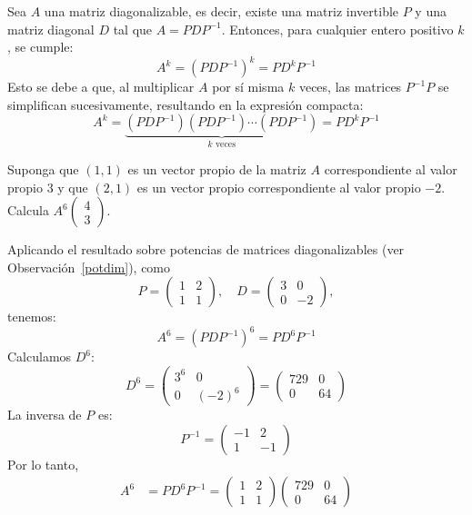 \begin{rem}\label{potdim}
Sea $A$ una matriz diagonalizable, es decir, existe una matriz invertible $P$ y una matriz diagonal $D$ tal que $A = P D P^{-1}$. Entonces, para cualquier entero positivo $k$, se cumple:
\[
A^k = (P D P^{-1})^k = P D^k P^{-1}
\]
Esto se debe a que, al multiplicar $A$ por sí misma $k$ veces, las matrices $P^{-1}P$ se simplifican sucesivamente, resultando en la expresión compacta:
\[
A^k = \underbrace{(P D P^{-1})(P D P^{-1}) \cdots (P D P^{-1})}_{k \text{ veces}} = P D^k P^{-1}
\]
\end{rem}

\begin{example}
Suponga que $(1,1)$ es un vector propio de la matriz $A$ correspondiente al valor propio $3$ y que $(2,1)$ es un vector propio correspondiente al valor propio $-2$. Calcula $A^6 \begin{pmatrix} 4 \\ 3 \end{pmatrix}$.
\begin{myproof}
Aplicando el resultado sobre potencias de matrices diagonalizables (ver Observación~\ref{potdim}), como
\[
P = \begin{pmatrix} 1 & 2 \\ 1 & 1 \end{pmatrix}, \quad D = \begin{pmatrix} 3 & 0 \\ 0 & -2 \end{pmatrix},
\]
tenemos:
\[
A^6 = (P D P^{-1})^6 = P D^6 P^{-1}
\]
Calculamos $D^6$:
\[
D^6 = \begin{pmatrix} 3^6 & 0 \\ 0 & (-2)^6 \end{pmatrix} = \begin{pmatrix} 729 & 0 \\ 0 & 64 \end{pmatrix}
\]
La inversa de $P$ es:
\[
P^{-1} = \begin{pmatrix} -1 & 2 \\ 1 & -1 \end{pmatrix}
\]
Por lo tanto,
\begin{align*}
A^6 &= P D^6 P^{-1} = 
\begin{pmatrix} 1 & 2 \\ 1 & 1 \end{pmatrix}
\begin{pmatrix} 729 & 0 \\ 0 & 64 \end{pmatrix}

\end{align*}
\end{myproof}
\end{example}
